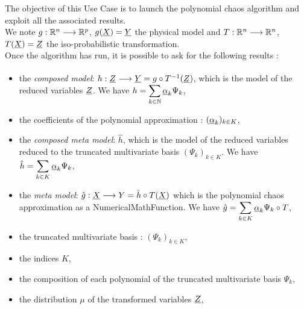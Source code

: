\renewcommand{\filename}{docUC_RespSurface_PolyChaosExploitation.tex}
\renewcommand{\filetitle}{UC : Run and results exploitation  of a polynomial chaos algorithm : coefficients, polynomial model, multivariate basis, truncated multivariate basis, ...}

\HeaderIIILevel




The objective of this Use Case is to launch the  polynomial chaos algorithm and exploit all the associated results.\\



We note  $g : {\mathbb R}^n \longrightarrow {\mathbb R}^p $, $g({\underline{X}}) = {\underline{Y}}$ the physical model  and $T : {\mathbb R}^n \longrightarrow {\mathbb R}^n $, $T({\underline{X}}) = {\underline{Z}}$ the iso-probabilistic transformation.\\

Once the algorithm has run, it is possible to ask for the following results :
\begin{itemize}
\item the {\em composed model}: $h : {\underline{Z}}^{\strut} \longrightarrow {\underline{Y}} = g \circ T^{-1}({\underline{Z}})$, which is the model of the reduced variables ${\underline{Z}}$. We have  $\displaystyle h =  \sum_{k \in {\mathbb N}} {\underline{\alpha}}_k \Psi_k$,
\item the coefficients of the polynomial approximation : $({\underline{\alpha}}_k)_{k \in K}$,
\item the {\em composed meta model}: $\hat{h}$, which is the model of the reduced variables reduced to the truncated multivariate basis $(\Psi_k)_{k \in K}$. We have $\displaystyle  \hat{h} = \sum_{k \in K} {\underline{\alpha}}_k \Psi_k$,
\item the {\em meta model}: $\displaystyle \hat{g} : {\underline{X}} \longrightarrow Y = \hat{h} \circ T({\underline{X}})$ which is the polynomial chaos approximation as a NumericalMathFunction. We have $\displaystyle \hat{g} = \sum_{k \in K} {\underline{\alpha}}_k \Psi_k \circ T$,
\item the truncated multivariate basis : $(\Psi_k)_{k \in K}$,
\item the indices $K$,
\item the composition of each polynomial of the truncated multivariate basis $\Psi_k$,
\item the distribution $\mu$ of the transformed variables ${\underline{Z}}$,
\end{itemize}



